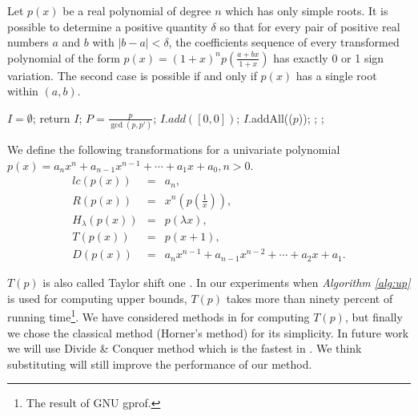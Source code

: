 \begin{theorem}\label{thm:vin}
  Let $p(x)$ be a real polynomial of degree $n$ which has only simple roots. It is possible to determine a positive quantity $\delta$ so that for every pair of positive real numbers $a$ and $b$ with $|b-a| < \delta$, the coefficients sequence of every transformed polynomial of the form
  $  p(x) = (1+x)^{n}p(\frac{a+bx}{1+x}) $
		  has exactly 0 or 1 sign variation. The second case is possible if and only if $p(x)$ has a single root within $(a,b)$.
\end{theorem}

\begin{algorithm}
\caption{\algm \label{alg:main}}
\DontPrintSemicolon
{}
$I=\emptyset$; \;
  {return $I$;}
$P=\frac{p}{\gcd(p,p')}$; 
 { $I.add([0,0])$; 
}
$I$.addAll(\algcf($p$)); \;
 
;\;
; 
\end{algorithm}


\begin{definition}  We define the following transformations for a univariate polynomial $p(x)=a_nx^n+a_{n-1}x^{n-1}+\cdots+a_1x+a_0,n>0$.
  \begin{eqnarray*}
  lc(p(x))&=&a_n,\\
  R(p(x))&=&x^n(p(\frac{1}{x})),\\
  H_\lambda(p(x))&=&p(\lambda x),\\
  T(p(x))&=&p(x+1), \\
  D(p(x))&=&a_nx^{n-1}+a_{n-1}x^{n-2}+\cdots+a_2x+a_1.
  \end{eqnarray*}
\end{definition}

$T(p)$  is also called	Taylor shift one \cite{ger04,joh05}. In our experiments when {\em Algorithm \ref{alg:up}} is used for computing upper bounds, $T(p)$  takes  more than
ninety percent of running time\footnote{The result of  GNU gprof.}.  We have considered methods in \cite{ger04} for computing $T(p)$, but   finally we chose the  classical
method (Horner's method) for its simplicity. In future work we will use Divide \& Conquer method which is the fastest in \cite{ger04}. We think  substituting
will still improve the performance of our method.


